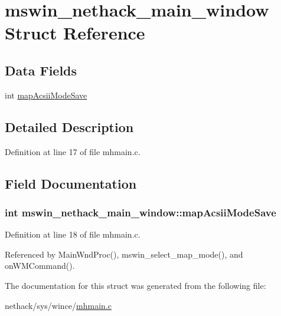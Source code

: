 \hypertarget{structmswin__nethack__main__window}{\section{mswin\+\_\+nethack\+\_\+main\+\_\+window Struct Reference}
\label{structmswin__nethack__main__window}
}
\subsection*{Data Fields}
\begin{DoxyCompactItemize}
\item 
int \hyperlink{structmswin__nethack__main__window_a2befc52d80c6b5673ce6846b24d2c266}{map\+Acsii\+Mode\+Save}
\end{DoxyCompactItemize}


\subsection{Detailed Description}


Definition at line 17 of file mhmain.\+c.



\subsection{Field Documentation}
\hypertarget{structmswin__nethack__main__window_a2befc52d80c6b5673ce6846b24d2c266}{
\subsubsection[{map\+Acsii\+Mode\+Save}]{\setlength{\rightskip}{0pt plus 5cm}int mswin\+\_\+nethack\+\_\+main\+\_\+window\+::map\+Acsii\+Mode\+Save}}\label{structmswin__nethack__main__window_a2befc52d80c6b5673ce6846b24d2c266}


Definition at line 18 of file mhmain.\+c.



Referenced by Main\+Wnd\+Proc(), mswin\+\_\+select\+\_\+map\+\_\+mode(), and on\+W\+M\+Command().



The documentation for this struct was generated from the following file\+:\begin{DoxyCompactItemize}
\item 
nethack/sys/wince/\hyperlink{sys_2wince_2mhmain_8c}{mhmain.\+c}\end{DoxyCompactItemize}
